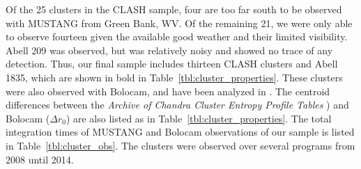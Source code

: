 \documentclass[iop,numberedappendix,apj]{emulateapj}
\begin{document}
Of the 25 clusters in the CLASH sample, four are too far south to be observed with MUSTANG from Green Bank, WV.
Of the remaining 21, we were only able to observe fourteen given the available good weather and their limited visibility.
Abell 209 was observed, but was relatively noisy and showed no trace of any detection. Thus, our final sample
includes thirteen CLASH clusters and Abell 1835, which are shown in bold in Table~\ref{tbl:cluster_properties}. These clusters
were also observed with Bolocam, and have been analyzed in \citet{sayers2012, sayers2013,czakon2014}. The centroid differences
between the \emph{Archive of Chandra Cluster Entropy Profile Tables} \citep[ACCEPT][]{cavagnolo2009}) 
and Bolocam ($\Delta r_0$) are also listed as  in Table~\ref{tbl:cluster_properties}. The total integration times of
MUSTANG and Bolocam observations of our sample is listed in Table~\ref{tbl:cluster_obs}. The clusters were observed over 
several programs from 2008 until 2014.
\end{document}

